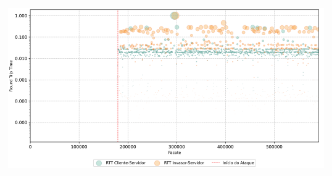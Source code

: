 \begin{apendicesenv}
\begin{figure}[htbp!]
\begin{subfigure}[t]{0.5\textwidth}
        \includegraphics[width=1\textwidth, height=120pt]{USPSC-img/output/cropped/2-mitm_port-rttp.png}
    \end{subfigure}%
\end{figure}

\end{apendicesenv}
